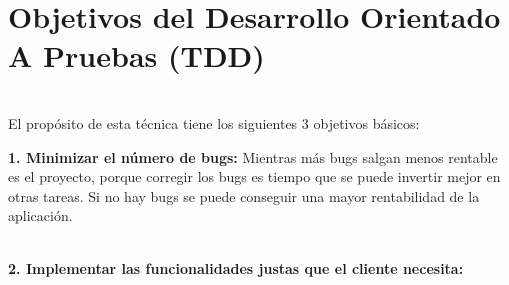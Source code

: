 \section{Objetivos del Desarrollo Orientado A Pruebas (TDD)} 

\textbf{}\\
El propósito de esta técnica tiene los siguientes 3 objetivos básicos:

\begin{flushleft}

\begin{center}
	
	\end{center}
\begin{itemize}
\textbf{1.	Minimizar el número de bugs: }
Mientras más bugs salgan menos rentable es el proyecto, porque corregir los bugs es tiempo que se puede invertir mejor en otras tareas. Si no hay bugs se puede conseguir una mayor rentabilidad de la aplicación.

\textbf{}\\
\textbf{2.	Implementar las funcionalidades justas que el cliente necesita:}


\end{itemize}
\end{flushleft}
